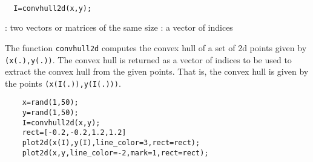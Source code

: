 \begin{mandesc}
  \\
\end{mandesc}
\begin{calling_sequence}
\begin{verbatim}
  I=convhull2d(x,y);
\end{verbatim}
\end{calling_sequence}
\begin{parameters}
  \begin{varlist}
    : two vectors or matrices of the same size
    : a vector of indices 
  \end{varlist}
\end{parameters}

\begin{mandescription}
  The function \verb+convhull2d+ computes the convex hull of 
  a set of 2d points given by \verb!(x(.),y(.))!. The convex 
  hull is returned as a vector of indices to be used to extract 
  the convex hull from the given points. That is, the convex hull 
  is given by the points \verb!(x(I(.)),y(I(.)))!.
\end{mandescription}
\begin{examples}
  \begin{Verbatim}
    x=rand(1,50);
    y=rand(1,50);
    I=convhull2d(x,y);
    rect=[-0.2,-0.2,1.2,1.2]
    plot2d(x(I),y(I),line_color=3,rect=rect);
    plot2d(x,y,line_color=-2,mark=1,rect=rect);
  \end{Verbatim}
\end{examples}

